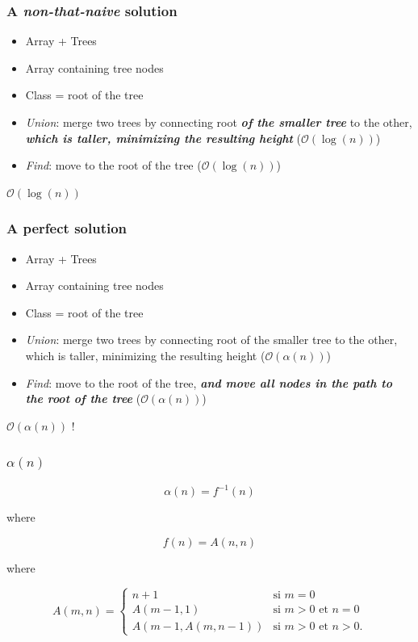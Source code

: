\documentclass[10pt,svgnames,usenames,table]{beamer} %
\newcommand{\bigoh}{\mathcal{O}}
\begin{document}
\begin{frame}
  \frametitle{A \textit{non-that-naive} solution}
  \begin{itemize}
  	\item Array + Trees
  	\item Array containing tree nodes
  	\item Class = root of the tree
  	\item \textit{Union}: merge two trees by connecting root \textbf{\textit{of the smaller tree}} to the other, \textbf{\textit{which is taller, minimizing the resulting height}} ($\bigoh(\log(n))$)
  	\item \textit{Find}: move to the root of the tree ($\bigoh(\log(n))$)
  \end{itemize}
  \begin{center}
  {\LARGE $\bigoh(\log(n))$}
  \end{center}
\end{frame}

\begin{frame}
  \frametitle{A perfect solution}
  \begin{itemize}
  	\item Array + Trees
  	\item Array containing tree nodes
  	\item Class = root of the tree
  	\item \textit{Union}: merge two trees by connecting root of the smaller tree to the other, which is taller, minimizing the resulting height ($\bigoh(\alpha(n))$)
  	\item \textit{Find}: move to the root of the tree, \textbf{\textit{and move all nodes in the path to the root of the tree}} ($\bigoh(\alpha(n))$)
  \end{itemize}
  \begin{center}
  {\LARGE $\bigoh(\alpha(n))$ !}
  \end{center}
\end{frame}

\begin{frame}
  \frametitle{$\alpha(n)$}
  $$\alpha(n) = f^{-1}(n)$$
  \begin{center}
  where
  \end{center}
  $$f(n) = A(n,n)$$
  \begin{center}
  where
  \end{center}
  $$A(m, n) = 
  \begin{cases}
     n+1 & \mbox{si } m = 0 \\
     A(m-1, 1) & \mbox{si } m > 0 \mbox{ et } n = 0 \\
     A(m-1, A(m, n-1)) & \mbox{si } m > 0 \mbox{ et } n > 0.
  \end{cases}$$
\end{frame}
\end{document}
